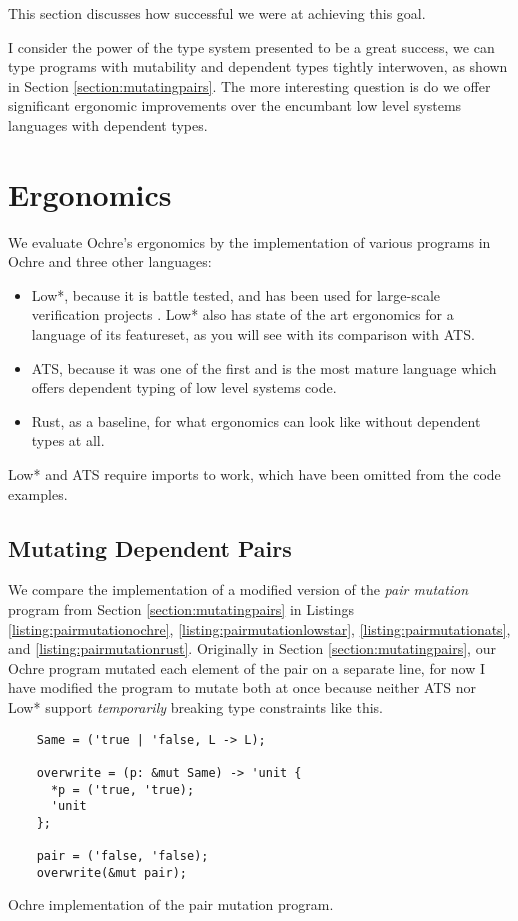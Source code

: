 \documentclass[12pt,twoside]{report}
\begin{document}
This section discusses how successful we were at achieving this goal.

I consider the power of the type system presented to be a great success, we can type programs with mutability and dependent types tightly interwoven, as shown in Section \ref{section:mutatingpairs}. The more interesting question is do we offer significant ergonomic improvements over the encumbant low level systems languages with dependent types.

\section{Ergonomics}
We evaluate Ochre's ergonomics by the implementation of various programs in Ochre and three other languages:
\begin{itemize}
  \item Low*, because it is battle tested, and has been used for large-scale verification projects \citep{zinzindohoueHACLVerifiedModern2017, ramananandroEverParseVerifiedSecure, taoDICEFormallyVerified}. Low* also has state of the art ergonomics for a language of its featureset, as you will see with its comparison with ATS.
  \item ATS, because it was one of the first and is the most mature language which offers dependent typing of low level systems code.
  \item Rust, as a baseline, for what ergonomics can look like without dependent types at all.
\end{itemize}
Low* and ATS require imports to work, which have been omitted from the code examples.

\subsection{Mutating Dependent Pairs}
We compare the implementation of a modified version of the \textit{pair mutation} program from Section \ref{section:mutatingpairs} in Listings \ref{listing:pairmutationochre}, \ref{listing:pairmutationlowstar}, \ref{listing:pairmutationats}, and \ref{listing:pairmutationrust}. Originally in Section \ref{section:mutatingpairs}, our Ochre program mutated each element of the pair on a separate line, for now I have modified the program to mutate both at once because neither ATS nor Low* support \textit{temporarily} breaking type constraints like this.

\begin{listing}
  \begin{verbatim}
    Same = ('true | 'false, L -> L); 
  
    overwrite = (p: &mut Same) -> 'unit {
      *p = ('true, 'true);
      'unit
    };
  
    pair = ('false, 'false);          
    overwrite(&mut pair);
  \end{verbatim}
  \caption{Ochre implementation of the pair mutation program.}
  \label{listing:pairmutationochre}
\end{listing}
\end{document}

